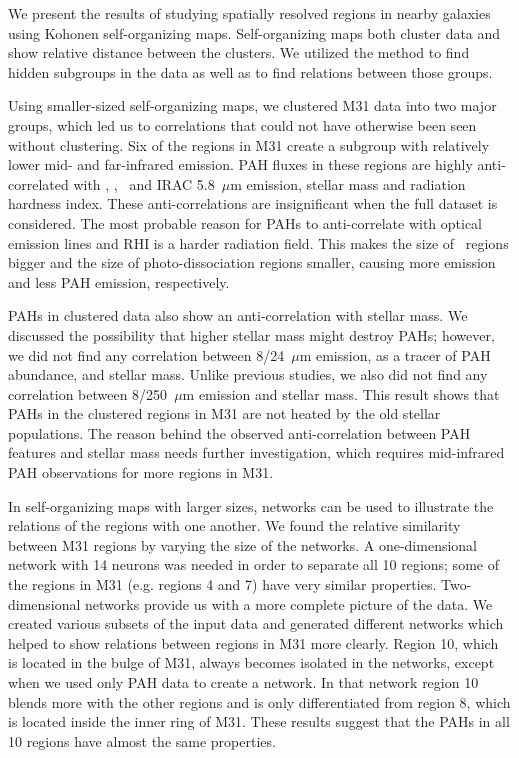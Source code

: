 We present the results of studying spatially resolved regions in nearby galaxies using Kohonen self-organizing maps.
Self-organizing maps both cluster data and show relative distance between the clusters. 
We utilized the method to find hidden subgroups in the data as well as to find relations between those groups.

Using smaller-sized self-organizing maps, we clustered M31 data into two major groups, which led us to correlations that could not have otherwise been seen without clustering.
Six of the regions in M31 create a subgroup with relatively lower mid- and far-infrared emission.
PAH fluxes in these regions are highly anti-correlated with \halphadot, \sii, \oiii~and IRAC 5.8~$\mu$m emission, stellar mass and radiation hardness index.
These anti-correlations are insignificant when the full dataset is considered.
The most probable reason for PAHs to anti-correlate with optical emission lines and RHI is a harder radiation field.
This makes the size of \hii~regions bigger and the size of photo-dissociation regions smaller, causing more \halpha emission and less PAH emission, respectively.

PAHs in clustered data also show an anti-correlation with stellar mass.
We discussed the possibility that higher stellar mass might destroy PAHs;
however, we did not find any correlation between 8/24~$\mu$m emission, as a tracer of PAH abundance, and stellar mass.
Unlike previous studies, we also did not find any correlation between 8/250~$\mu$m emission and stellar mass. 
This result shows that PAHs in the clustered regions in M31 are not heated by the old stellar populations.
The reason behind the observed anti-correlation between PAH features and stellar mass needs further investigation, which requires mid-infrared PAH observations for more regions in M31. 

In self-organizing maps with larger sizes, networks can be used to illustrate the relations of the regions with one another.
We found the relative similarity between M31 regions by varying the size of the networks.
A one-dimensional network with 14 neurons was needed in order to
separate all 10 regions; some of the regions in M31 (e.g. regions 4 and 7) have very similar properties.
Two-dimensional networks provide us with a more complete picture of the data.
We created various subsets of the input data and generated different networks which helped to show relations between regions in M31 more clearly.
Region 10, which is located in the bulge of M31, always becomes isolated in the networks, except when we  used only PAH data to create a network.
In that network region 10 blends more with the other regions and is only differentiated from region 8, which is located inside the inner ring of M31.
These results suggest that the PAHs in all 10 regions have almost the same properties.

